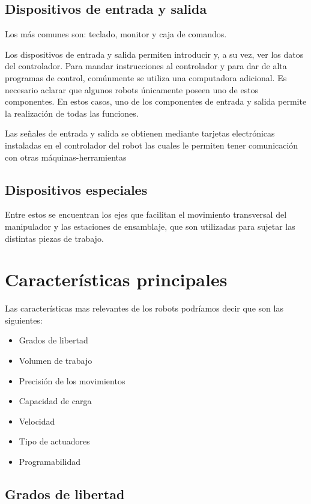 \documentclass[12pt,a4paper]{report}
\begin{document}
\subsection{Dispositivos de entrada y salida}
Los más comunes son: teclado, monitor y caja de comandos.

Los dispositivos de entrada y salida permiten introducir y, a su vez, ver los
datos del controlador. Para mandar instrucciones al controlador y para dar de
alta programas de control, comúnmente se utiliza una computadora adicional. Es
necesario aclarar que algunos robots únicamente poseen uno de estos componentes.
En estos casos, uno de los componentes de entrada y salida permite la
realización de todas las funciones.

Las señales de entrada y salida se obtienen mediante tarjetas electrónicas
instaladas en el controlador del robot las cuales le permiten tener comunicación
con otras máquinas-herramientas


\subsection{Dispositivos especiales}
Entre estos se encuentran los ejes que facilitan el movimiento transversal del
manipulador y las estaciones de ensamblaje, que son utilizadas para sujetar las
distintas piezas de trabajo.



\section{Características principales}

Las características mas relevantes de los robots podríamos decir que son las
siguientes:

\begin{itemize}
    \item Grados de libertad
    \item Volumen de trabajo
    \item Precisión de los movimientos
    \item Capacidad de carga
    \item Velocidad
    \item Tipo de actuadores
    \item Programabilidad
\end{itemize}
 

    
\subsection{Grados de libertad}
\end{document}
